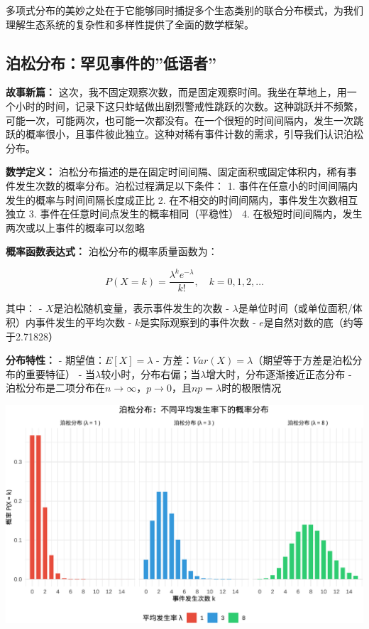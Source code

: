 \documentclass[
]{book}
\begin{document}
多项式分布的美妙之处在于它能够同时捕捉多个生态类别的联合分布模式，为我们理解生态系统的复杂性和多样性提供了全面的数学框架。

\hypertarget{ux6ccaux677eux5206ux5e03ux7f55ux89c1ux4e8bux4ef6ux7684ux4f4eux8bedux8005}{%
\subsection{泊松分布：罕见事件的''低语者''}\label{ux6ccaux677eux5206ux5e03ux7f55ux89c1ux4e8bux4ef6ux7684ux4f4eux8bedux8005}}

\textbf{故事新篇：} 这次，我不固定观察次数，而是固定观察时间。我坐在草地上，用一个小时的时间，记录下这只蚱蜢做出剧烈警戒性跳跃的次数。这种跳跃并不频繁，可能一次，可能两次，也可能一次都没有。在一个很短的时间间隔内，发生一次跳跃的概率很小，且事件彼此独立。这种对稀有事件计数的需求，引导我们认识泊松分布。

\textbf{数学定义：} 泊松分布描述的是在固定时间间隔、固定面积或固定体积内，稀有事件发生次数的概率分布。泊松过程满足以下条件：
1. 事件在任意小的时间间隔内发生的概率与时间间隔长度成正比
2. 在不相交的时间间隔内，事件发生次数相互独立
3. 事件在任意时间点发生的概率相同（平稳性）
4. 在极短时间间隔内，发生两次或以上事件的概率可以忽略

\textbf{概率函数表达式：} 泊松分布的概率质量函数为：

\[P(X = k) = \frac{\lambda^k e^{-\lambda}}{k!}, \quad k = 0, 1, 2, \ldots\]

其中：
- \(X\)是泊松随机变量，表示事件发生的次数
- \(\lambda\)是单位时间（或单位面积/体积）内事件发生的平均次数
- \(k\)是实际观察到的事件次数
- \(e\)是自然对数的底（约等于2.71828）

\textbf{分布特性：}
- 期望值：\(E[X] = \lambda\)
- 方差：\(Var(X) = \lambda\)（期望等于方差是泊松分布的重要特征）
- 当\(\lambda\)较小时，分布右偏；当\(\lambda\)增大时，分布逐渐接近正态分布
- 泊松分布是二项分布在\(n \to \infty\)，\(p \to 0\)，且\(np = \lambda\)时的极限情况

\begin{center}\includegraphics[width=0.8\linewidth]{ecological-statistics_files/figure-latex/unnamed-chunk-23-1} \end{center}
\end{document}
